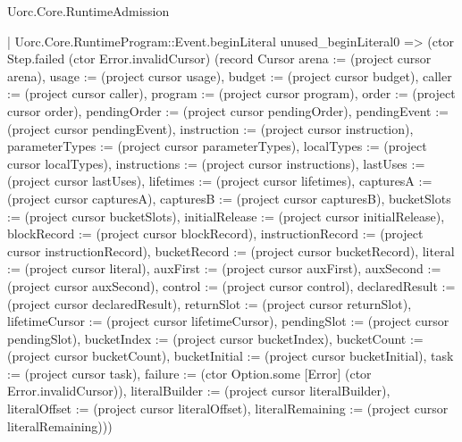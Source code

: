 \begin{lexlean}{Uorc.Core.RuntimeAdmission}
\begin{semanticmodule}
{          | Uorc.Core.RuntimeProgram::Event.beginLiteral unused_beginLiteral0 => (ctor Step.failed (ctor Error.invalidCursor) (record Cursor {arena := (project cursor arena), usage := (project cursor usage), budget := (project cursor budget), caller := (project cursor caller), program := (project cursor program), order := (project cursor order), pendingOrder := (project cursor pendingOrder), pendingEvent := (project cursor pendingEvent), instruction := (project cursor instruction), parameterTypes := (project cursor parameterTypes), localTypes := (project cursor localTypes), instructions := (project cursor instructions), lastUses := (project cursor lastUses), lifetimes := (project cursor lifetimes), capturesA := (project cursor capturesA), capturesB := (project cursor capturesB), bucketSlots := (project cursor bucketSlots), initialRelease := (project cursor initialRelease), blockRecord := (project cursor blockRecord), instructionRecord := (project cursor instructionRecord), bucketRecord := (project cursor bucketRecord), literal := (project cursor literal), auxFirst := (project cursor auxFirst), auxSecond := (project cursor auxSecond), control := (project cursor control), declaredResult := (project cursor declaredResult), returnSlot := (project cursor returnSlot), lifetimeCursor := (project cursor lifetimeCursor), pendingSlot := (project cursor pendingSlot), bucketIndex := (project cursor bucketIndex), bucketCount := (project cursor bucketCount), bucketInitial := (project cursor bucketInitial), task := (project cursor task), failure := (ctor Option.some [Error] (ctor Error.invalidCursor)), literalBuilder := (project cursor literalBuilder), literalOffset := (project cursor literalOffset), literalRemaining := (project cursor literalRemaining)}))
}
\end{semanticmodule}
\end{lexlean}
